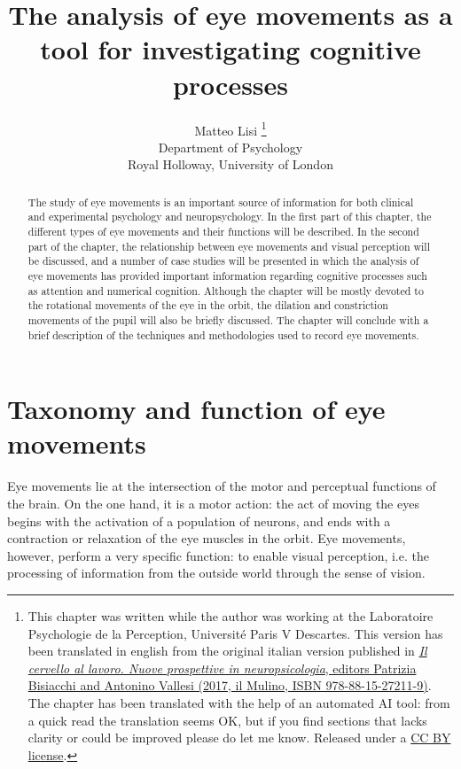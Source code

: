 \documentclass[11pt]{article}
\title{The analysis of eye movements as a tool for investigating cognitive processes}
\author{
        Matteo Lisi \footnote{\scriptsize{This chapter was written while the author was working at the Laboratoire Psychologie de la Perception, Université Paris V Descartes. This version has been translated in english from the original italian version published in \href{https://www.mulino.it/isbn/9788815272119}{\textit{Il cervello al lavoro. Nuove prospettive in neuropsicologia}, editors Patrizia Bisiacchi and Antonino Vallesi (2017, il Mulino, ISBN 978-88-15-27211-9)}. The chapter has been translated with the help of an automated AI tool: from a quick read the translation seems OK, but if you find sections that lacks clarity or could be improved please do let me know. Released under a \href{https://creativecommons.org/licenses/by/2.0/}{CC BY license}.}} \\
        \small{Department of Psychology}\\
        \small{Royal Holloway, University of London}
}
\date{}
\begin{document}
\sloppy
\maketitle

\begin{abstract}
The study of eye movements is an important source of information for both clinical and experimental psychology and neuropsychology. In the first part of this chapter, the different types of eye movements and their functions will be described. In the second part of the chapter, the relationship between eye movements and visual perception will be discussed, and a number of case studies will be presented in which the analysis of eye movements has provided important information regarding cognitive processes such as attention and numerical cognition. Although the chapter will be mostly devoted to the rotational movements of the eye in the orbit, the dilation and constriction movements of the pupil will also be briefly discussed. The chapter will conclude with a brief description of the techniques and methodologies used to record eye movements.
\end{abstract}

\section{Taxonomy and function of eye movements}
Eye movements lie at the intersection of the motor and perceptual functions of the brain. On the one hand, it is a motor action: the act of moving the eyes begins with the activation of a population of neurons, and ends with a contraction or relaxation of the eye muscles in the orbit. Eye movements, however, perform a very specific function: to enable visual perception, i.e. the processing of information from the outside world through the sense of vision.
\end{document}

